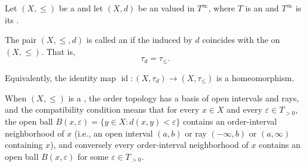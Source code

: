 \begin{definition} \label{definition:ordered_extended_metric_space_valued_in_an_ordered_commutative_monoid_with_adjoined_infinity}
    Let $(X, \leq)$ be a  and let $(X, d)$ be an  valued in $T^\infty$, where $T$ is an  and $T^\infty$ is its .

    The pair $(X, \leq, d)$ is called an  if the  induced by $d$ coincides with the  on $(X, \leq)$. That is,
    $$\tau_d = \tau_{\leq}.$$

    Equivalently, the identity map $\operatorname{id}: (X, \tau_d) \to (X, \tau_{\leq})$ is a homeomorphism.

    When $(X, \leq)$ is a , the order topology has a basis of open intervals and rays, and the compatibility condition means that for every $x \in X$ and every $\varepsilon \in T_{>0}$, the open ball $B(x, \varepsilon) = \{y \in X : d(x, y) < \varepsilon\}$ contains an order-interval neighborhood of $x$ (i.e., an open interval $(a, b)$ or ray $(-\infty, b)$ or $(a, \infty)$ containing $x$), and conversely every order-interval neighborhood of $x$ contains an open ball $B(x, \varepsilon)$ for some $\varepsilon \in T_{>0}$.

\end{definition}